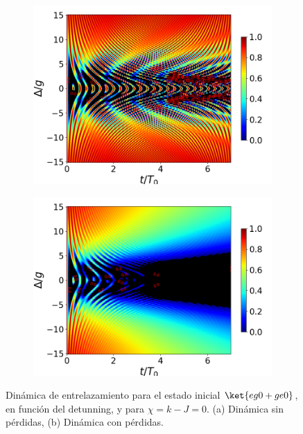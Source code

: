 \begin{figure}[H]
    \centering
    \begin{subfigure}{0.49\textwidth}
        \includegraphics[width=\textwidth]{figuras/ch4/concu/delta/eg1+ge1 k=0.0g x=0.0g J=0.0g gamma=0.25g concu delta uni.png}
        \caption{}
        \label{fig4:concu detunning 1 uni}
    \end{subfigure}
    \hfill
    \begin{subfigure}{0.49\textwidth}
        \includegraphics[width=\textwidth]{figuras/ch4/concu/delta/eg1+ge1 k=0.0g x=0.0g J=0.0g gamma=0.25g concu delta dis.png}
        \caption{}
        \label{fig4:concu detunning 1 dis}
    \end{subfigure}
    \caption{Dinámica de entrelazamiento para el estado inicial $\ket{eg0+ge0}$, en función del detunning, y para $\chi=k-J=0$. (a) Dinámica sin pérdidas, (b) Dinámica con pérdidas.}
    \label{fig4:concu detunning 1}
\end{figure}

